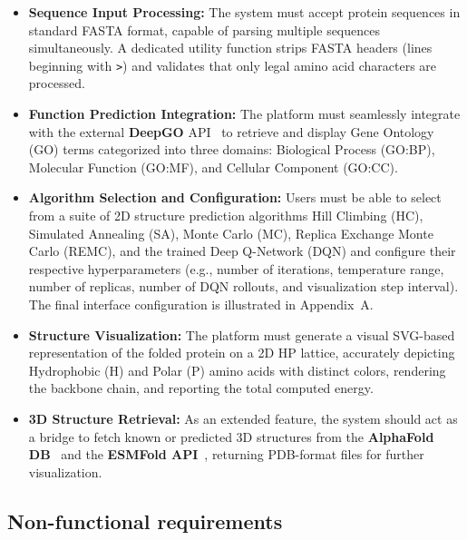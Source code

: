 \begin{itemize}
    \item \textbf{Sequence Input Processing:} The system must accept protein sequences in standard FASTA format, capable of parsing multiple sequences simultaneously. A dedicated utility function strips FASTA headers (lines beginning with \texttt{>}) and validates that only legal amino acid characters are processed.

    \item \textbf{Function Prediction Integration:} The platform must seamlessly integrate with the external \textbf{DeepGO} API~\cite{kulmanov2018deepgo} to retrieve and display Gene Ontology (GO) terms categorized into three domains: Biological Process (GO:BP), Molecular Function (GO:MF), and Cellular Component (GO:CC).

    \item \textbf{Algorithm Selection and Configuration:} Users must be able to select from a suite of 2D structure prediction algorithms Hill Climbing (HC), Simulated Annealing (SA), Monte Carlo (MC), Replica Exchange Monte Carlo (REMC), and the trained Deep Q-Network (DQN) and configure their respective hyperparameters (e.g., number of iterations, temperature range, number of replicas, number of DQN rollouts, and visualization step interval). The final interface configuration is illustrated in Appendix~A.

    \item \textbf{Structure Visualization:} The platform must generate a visual SVG-based representation of the folded protein on a 2D HP lattice, accurately depicting Hydrophobic (H) and Polar (P) amino acids with distinct colors, rendering the backbone chain, and reporting the total computed energy.

    \item \textbf{3D Structure Retrieval:} As an extended feature, the system should act as a bridge to fetch known or predicted 3D structures from the \textbf{AlphaFold DB}~\cite{varadi2022alphafold} and the \textbf{ESMFold API}~\cite{lin2023evolutionary}, returning PDB-format files for further visualization.
\end{itemize}

\subsection{Non-functional requirements}
\label{cap3:subsec_nonfunctional_requirements}


